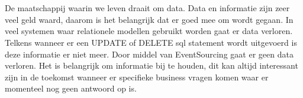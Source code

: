 


\chapter*{}

De maatschappij waarin we leven draait om data. Data en informatie zijn zeer veel geld waard, daarom is het belangrijk dat er goed mee om wordt gegaan. In veel systemen waar relationele modellen gebruikt worden gaat er data verloren. Telkens wanneer er een UPDATE of DELETE sql statement wordt uitgevoerd is deze informatie er niet meer. Door middel van EventSourcing gaat er geen data verloren.
Het is belangrijk om informatie bij te houden, dit kan altijd interessant zijn in de toekomst wanneer er specifieke business vragen komen waar er momenteel nog geen antwoord op is.
